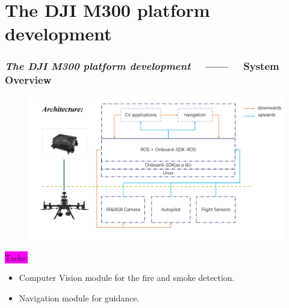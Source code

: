 \section{The DJI M300 platform development }

\begin{frame}
    \frametitle{\textit{The DJI M300 platform development }
    ~~------~~ System Overview}
    \begin{figure}[H]
        \centering
        \includegraphics[width=1\textwidth]{./imgs/discuss.pdf}
    \end{figure}

    \colorbox{magenta}{Tasks:}
\begin{itemize}
    \item Computer Vision module for the fire and smoke detection.
    \item Navigation module for guidance.
\end{itemize}

\end{frame}
